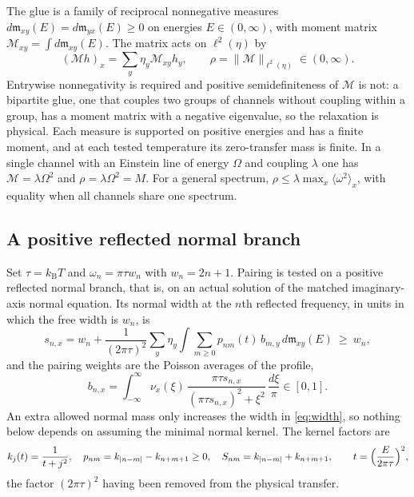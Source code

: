 \documentclass[aps,10pt,superscriptaddress,floatfix,amsmath,amssymb,nofootinbib]{revtex4-2}
\newcommand{\kb}{k_{\mathrm B}}
\newcommand{\mm}{\mathfrak m}
\newcommand{\Mmat}{\mathcal M}
\begin{document}
The glue is a family of reciprocal nonnegative measures
$d\mm_{xy}(E)=d\mm_{yx}(E)\ge0$ on energies $E\in(0,\infty)$, with moment matrix
$\Mmat_{xy}=\int d\mm_{xy}(E)$. The matrix acts on $\ell^{2}(\eta)$ by
\begin{equation}\label{eq:moment}
(\Mmat h)_x=\sum_y\eta_y\Mmat_{xy}h_y,\qquad
\rho=\|\Mmat\|_{\ell^{2}(\eta)}\in(0,\infty).
\end{equation}
Entrywise nonnegativity is required and positive semidefiniteness of $\Mmat$ is not: a
bipartite glue, one that couples two groups of channels without coupling within a group,
has a moment matrix with a negative eigenvalue, so the relaxation is physical. Each measure
is supported on positive energies and has a finite moment, and at each tested temperature
its zero-transfer mass is finite. In a single channel with an Einstein line of energy
$\Omega$ and coupling $\lambda$ one has $\Mmat=\lambda\Omega^{2}$ and $\rho=\lambda
\Omega^{2}=M$. For a general spectrum, $\rho\le\lambda\max_x\langle\omega^{2}\rangle_x$,
with equality when all channels share one spectrum.

\subsection{A positive reflected normal branch}

Set $\tau=\kb T$ and $\omega_n=\pi\tau w_n$ with $w_n=2n+1$. Pairing is tested on a
positive reflected normal branch, that is, on an actual solution of the matched
imaginary-axis normal equation. Its normal width at the $n$th reflected frequency, in
units in which the free width is $w_n$, is
\begin{equation}\label{eq:width}
s_{n,x}=w_n+\frac{1}{(2\pi\tau)^{2}}\sum_y\eta_y\int\sum_{m\ge0}p_{nm}(t)\,b_{m,y}\,
d\mm_{xy}(E)\ \ge\ w_n,
\end{equation}
and the pairing weights are the Poisson averages of the profile,
\begin{equation}\label{eq:weights}
b_{n,x}=\int_{-\infty}^{\infty}\nu_x(\xi)\,
\frac{\pi\tau s_{n,x}}{(\pi\tau s_{n,x})^{2}+\xi^{2}}\,\frac{d\xi}{\pi}\in[0,1].
\end{equation}
An extra allowed normal mass only increases the width in \eqref{eq:width}, so nothing
below depends on assuming the minimal normal kernel. The kernel factors are
\begin{equation}\label{eq:kernel}
k_j(t)=\frac{1}{t+j^{2}},\quad
p_{nm}=k_{|n-m|}-k_{n+m+1}\ge0,\quad
S_{nm}=k_{|n-m|}+k_{n+m+1},\qquad t=\Bigl(\frac{E}{2\pi\tau}\Bigr)^{2},
\end{equation}
the factor $(2\pi\tau)^{2}$ having been removed from the physical transfer.
\end{document}

